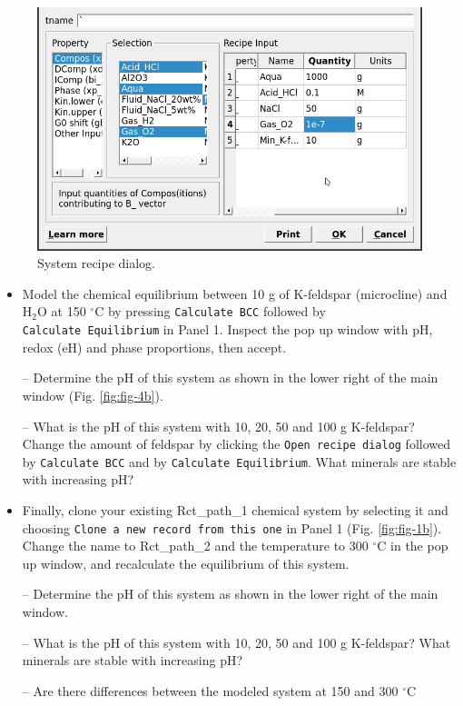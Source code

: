\documentclass[
]{book}
\begin{document}
\begin{figure}
\includegraphics[width=0.7\linewidth]{figures/module2/fig-3} \caption{System recipe dialog.}\label{fig:fig-3b}
\end{figure}

\begin{itemize}
\item
  Model the chemical equilibrium between 10 g of K-feldspar (microcline) and H\(_2\)O at 150 \(^\circ\)C by pressing \texttt{Calculate\ BCC} followed by \texttt{Calculate\ Equilibrium} in Panel 1. Inspect the pop up window with pH, redox (eH) and phase proportions, then accept.

  -- Determine the pH of this system as shown in the lower right of the main window (Fig. \ref{fig:fig-4b}).

  -- What is the pH of this system with 10, 20, 50 and 100 g K-feldspar? Change the amount of feldspar by clicking the \texttt{Open\ recipe\ dialog} followed by \texttt{Calculate\ BCC} and by \texttt{Calculate\ Equilibrium}. What minerals are stable with increasing pH?
\item
  Finally, clone your existing Rct\_path\_1 chemical system by selecting it and choosing \texttt{Clone\ a\ new\ record\ from\ this\ one} in Panel 1 (Fig. \ref{fig:fig-1b}). Change the name to Rct\_path\_2 and the temperature to 300 \(^\circ\)C in the pop up window, and recalculate the equilibrium of this system.

  -- Determine the pH of this system as shown in the lower right of the main window.

  -- What is the pH of this system with 10, 20, 50 and 100 g K-feldspar? What minerals are stable with increasing pH?

  -- Are there differences between the modeled system at 150 and 300 \(^\circ\)C
\end{itemize}
\end{document}
